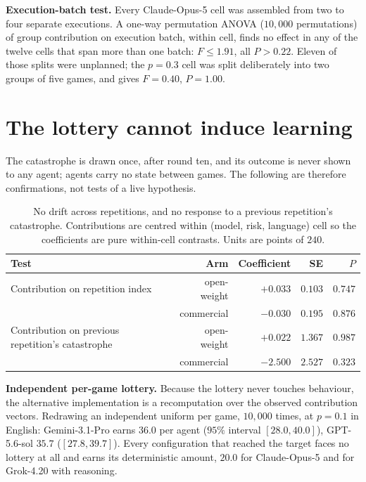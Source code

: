 \documentclass[11pt,a4paper]{article}
\begin{document}
\smallskip
\noindent \textbf{Execution-batch test.} Every Claude-Opus-5 cell was assembled from two
to four separate executions. A one-way permutation ANOVA ($10{,}000$ permutations) of
group contribution on execution batch, within cell, finds no effect in any of the twelve
cells that span more than one batch: $F \le 1.91$, all $P > 0.22$. Eleven of those splits
were unplanned; the $p=0.3$ cell was split deliberately into two groups of five games,
and gives $F=0.40$, $P=1.00$.

\section{The lottery cannot induce learning}
\label{sec:lottery}

The catastrophe is drawn once, after round ten, and its outcome is never shown to
any agent; agents carry no state between games. The following are therefore
confirmations, not tests of a live hypothesis.

\begin{table}[h]
\centering
\caption{No drift across repetitions, and no response to a previous repetition's
catastrophe. Contributions are centred within (model, risk, language) cell so the
coefficients are pure within-cell contrasts. Units are points of $240$.}
\begin{tabular}{@{}lrrrr@{}}
\toprule
Test & Arm & Coefficient & SE & $P$ \\
\midrule
Contribution on repetition index & open-weight & $+0.033$ & $0.103$ & $0.747$ \\
                                 & commercial  & $-0.030$ & $0.195$ & $0.876$ \\
Contribution on previous repetition's catastrophe & open-weight & $+0.022$ & $1.367$ & $0.987$ \\
                                 & commercial  & $-2.500$ & $2.527$ & $0.323$ \\
\bottomrule
\end{tabular}
\end{table}

\noindent \textbf{Independent per-game lottery.} Because the lottery never touches
behaviour, the alternative implementation is a recomputation over the observed
contribution vectors. Redrawing an independent uniform per game, $10{,}000$ times, at
$p=0.1$ in English: Gemini-3.1-Pro earns $36.0$ per agent ($95\%$ interval
$[28.0,40.0]$), GPT-5.6-sol $35.7$ ($[27.8,39.7]$). Every configuration that reached the
target faces no lottery at all and earns its deterministic amount, $20.0$ for
Claude-Opus-5 and for Grok-4.20 with reasoning.
\end{document}
